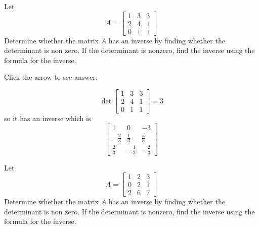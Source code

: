 \documentclass{ximera}
\begin{document}
\begin{problem}\label{prb:7.28} Let
\begin{equation*}
A=
\left[
\begin{array}{rrr}
1 & 3 & 3 \\
2 & 4 & 1 \\
0 & 1 & 1
\end{array}
\right]
\end{equation*}
Determine whether the matrix $A$ has an inverse by finding whether the
determinant is non zero. If the determinant is nonzero, find the inverse
using the formula for the inverse.

Click the arrow to see answer.
\begin{expandable}
\[
\det \left[
\begin{array}{ccc}
1 & 3 & 3 \\
2 & 4 & 1 \\
0 & 1 & 1
\end{array}
\right] = 3
\]
so it has an inverse which is
\[
\left[
\begin{array}{rrr}
1 & 0 & -3 \\
-\frac{2}{3} & \frac{1}{3} & \frac{5}{3} \\
\frac{2}{3} & -\frac{1}{3} & -\frac{2}{3}
\end{array}
\right]
\]
\end{expandable}
\end{problem}

\begin{problem}\label{prb:7.29} Let
\begin{equation*}
A =
\left[
\begin{array}{rrr}
1 & 2 & 3 \\
0 & 2 & 1 \\
2 & 6 & 7
\end{array}
\right]
\end{equation*}
Determine whether the matrix $A$ has an inverse by finding whether the
determinant is non zero. If the determinant is nonzero, find the inverse
using the formula for the inverse.
\end{problem}
\end{document}

